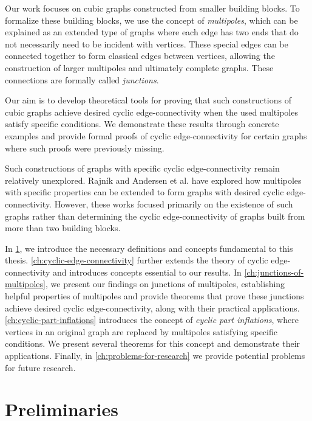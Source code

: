 \documentclass[12pt, twoside]{book}
\begin{document}
Our work focuses on cubic graphs constructed from smaller building blocks. To formalize these building blocks, we use the concept of \textit{multipoles}, which can be explained as an extended type of graphs where each edge has two ends that do not necessarily need to be incident with vertices. These special edges can be connected together to form classical edges between vertices, allowing the construction of larger multipoles and ultimately complete graphs. These connections are formally called \textit{junctions}.

Our aim is to develop theoretical tools for proving that such constructions of cubic graphs achieve desired cyclic edge-connectivity when the used multipoles satisfy specific conditions. We demonstrate these results through concrete examples and provide formal proofs of cyclic edge-connectivity for certain graphs where such proofs were previously missing.

Such constructions of graphs with specific cyclic edge-connectivity remain relatively unexplored. Rajník \cite{Rajnik_phd} and Andersen et al. \cite{Andersen1988} have explored how multipoles with specific properties can be extended to form graphs with desired cyclic edge-connectivity. However, these works focused primarily on the existence of such graphs rather than determining the cyclic edge-connectivity of graphs built from more than two building blocks.

In \cref{ch:preliminaries}, we introduce the necessary definitions and concepts fundamental to this thesis. \cref{ch:cyclic-edge-connectivity} further extends the theory of cyclic edge-connectivity and introduces concepts essential to our results. In \cref{ch:junctions-of-multipoles}, we present our findings on junctions of multipoles, establishing helpful properties of multipoles and provide theorems that prove these junctions achieve desired cyclic edge-connectivity, along with their practical applications. \cref{ch:cyclic-part-inflations} introduces the concept of \textit{cyclic part inflations}, where vertices in an original graph are replaced by multipoles satisfying specific conditions. We present several theorems for this concept and demonstrate their applications. Finally, in \cref{ch:problems-for-research} we provide potential problems for future research.

\chapter{Preliminaries}\label{ch:preliminaries}
\end{document}
